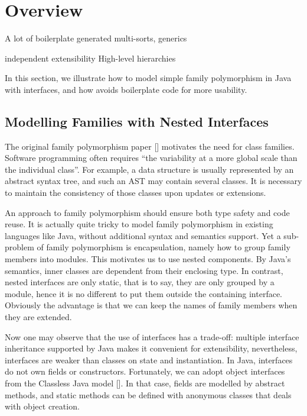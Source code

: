 \section{Overview}\label{sec:overview}

A lot of boilerplate generated
multi-sorts, generics

independent extensibility
High-level hierarchies

In this section, we illustrate how to model simple family polymorphism in Java with interfaces,
and how \name avoids boilerplate code for more usability.

\subsection{Modelling Families with Nested Interfaces}

The original family polymorphism paper [] motivates the need for class families. Software programming
often requires ``the variability at a more global scale than the individual class''. For example, a data
structure is usually represented by an abstract syntax tree, and such an AST may contain several classes.
It is necessary to maintain the consistency of those classes upon updates or extensions. 

An approach to family polymorphism should ensure both type safety and code reuse. It is actually quite tricky to model
family polymorphism in existing languages like Java, without additional syntax and semantics support. Yet a sub-problem of
family polymorphism is encapsulation, namely how to group family members into modules. This motivates us to use nested components.
By Java's semantics, inner classes are dependent from their enclosing type. In contrast, nested interfaces are only static, that is
to say, they are only grouped by a module, hence it is no different to put them outside the containing interface. Obviously
the advantage is that we can keep the names of family members when they are extended. 

Now one may observe that the use of interfaces has a trade-off: multiple interface inheritance supported by Java makes it convenient for extensibility, nevertheless,
interfaces are weaker than classes on state and instantiation. In Java, interfaces do not own fields or constructors.
Fortunately, we can adopt object interfaces from the Classless Java model []. In that case, fields are modelled by abstract methods,
and static methods can be defined with anonymous classes that deals with object creation.

